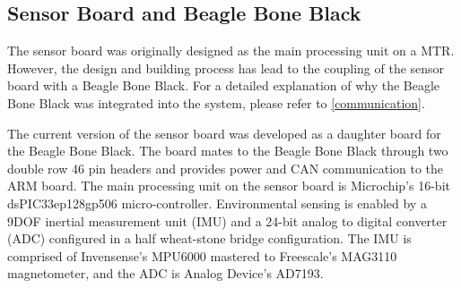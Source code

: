 \begin{table}[th]
\centering
\caption{100W Maxon BLDC Motor Parameters}
\label{motor_parameters}
\begin{center}%
\end{center}
\end{table}

\subsection{Sensor Board and Beagle Bone Black}
\label{sensor_bbb}
The sensor board was originally designed as the main processing unit on a MTR. 
However, the design and building process has lead to the coupling of the sensor board with a Beagle Bone Black.
For a detailed explanation of why the Beagle Bone Black was integrated into the system, please refer to \ref{communication}.

The current version of the sensor board was developed as a daughter board for the Beagle Bone Black.
The board mates to the Beagle Bone Black through two double row 46 pin headers and provides power and CAN communication to the ARM board.
The main processing unit on the sensor board is Microchip's 16-bit dsPIC33ep128gp506 micro-controller.
Environmental sensing is enabled by a 9DOF inertial measurement unit (IMU) and a 24-bit analog to digital converter (ADC) configured in a half wheat-stone bridge configuration.
The IMU is comprised of Invensense's MPU6000 mastered to Freescale's MAG3110 magnetometer, and the ADC is Analog Device's AD7193.

